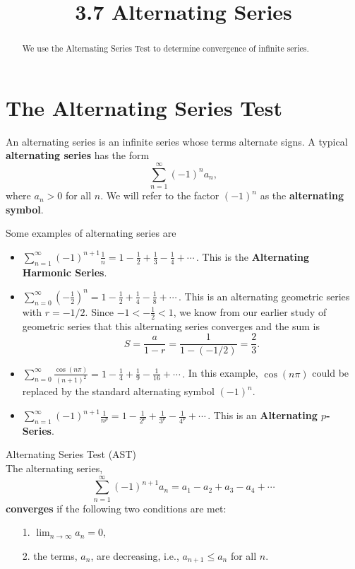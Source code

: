 \documentclass[handout]{ximera}
\title{3.7 Alternating Series}
\begin{document}
\begin{abstract}
We use the Alternating Series Test to determine convergence of infinite series.
\end{abstract}

\maketitle


\section{The Alternating Series Test}

An alternating series is an infinite series whose terms alternate signs.
A typical \textbf{alternating series} has the form 
\[
\sum_{n=1}^\infty (-1)^n a_n,
\]
where $a_n > 0$ for all $n$. We will refer to the factor $(-1)^n$ as the \textbf{alternating symbol}.

Some examples of alternating series are
\begin{itemize}

\item $\displaystyle{\sum_{n=1}^\infty (-1)^{n+1} \frac{1}{n} = 1 - \frac12 + \frac13 - \frac14 + \cdots  }\, .$  This is the \textbf{Alternating Harmonic Series}.

\item $\displaystyle{\sum_{n=0}^\infty \left(-\frac12\right)^n = 1 - \frac12 + \frac14 - \frac18 + \cdots }\, .$  This is an alternating geometric series with $r=-1/2$.
Since $-1 < -\frac12 < 1$, we know from our earlier study of geometric series that this alternating series converges and 
the sum is 
\[
S = \frac{a}{1-r} = \frac{1}{1-(-1/2)} = \frac23.
\]

\item $\displaystyle{\sum_{n=0}^\infty \frac{\cos(n\pi)}{(n+1)^2} = 1 - \frac14 + \frac19 - \frac{1}{16} + \cdots}\, .$ 
In this example, $\cos(n\pi)$ could be replaced by the standard alternating symbol $(-1)^n$.


\item $\displaystyle{\sum_{n=1}^\infty (-1)^{n+1} \frac{1}{n^p} = 1 - \frac{1}{2^p} + \frac{1}{3^p} - \frac{1}{4^p} + \cdots  }\, .$  This is an \textbf{Alternating $p$-Series}.


\end{itemize}

\begin{theorem} Alternating Series Test (AST)\\
The alternating series, 
\[
\sum_{n=1}^\infty (-1)^{n+1} a_n = a_1 - a_2 + a_3 - a_4 + \cdots
\]
\textbf{converges} if the following two conditions are met:
\begin{itemize}
\item[1.] $\displaystyle{\lim_{n\to\infty} a_n = 0}$,
\item[2.] the terms, $a_n$, are decreasing, i.e., $a_{n+1} \leq a_n$ for all $n$.
\end{itemize}
\end{theorem}
\end{document}
